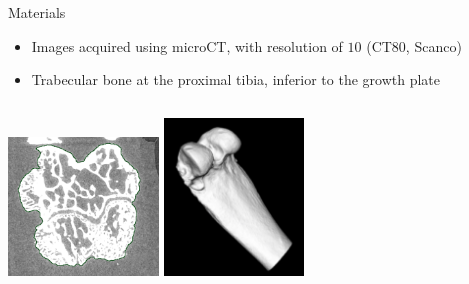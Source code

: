 \documentclass[10pt,aspectratio=169]{beamer}
\begin{document}
\begin{frame}[fragile]{Materials}
\begin{itemize} \itemsep1em
\item Images acquired using microCT, with resolution of $10$\si{\micro} (\si{\micro}CT80, Scanco)
\item Trabecular bone at the proximal tibia, inferior to the growth plate
\end{itemize}
\vspace{0.5cm}
\begin{columns}[onlytextwidth]
    \centering
    \includegraphics[width=4cm]{figures/bone_materials.png}
    \centering
    \includegraphics[width=3.7cm]{figures/bone_materials_3D.png}
\end{columns}
\end{frame}
\end{document}
